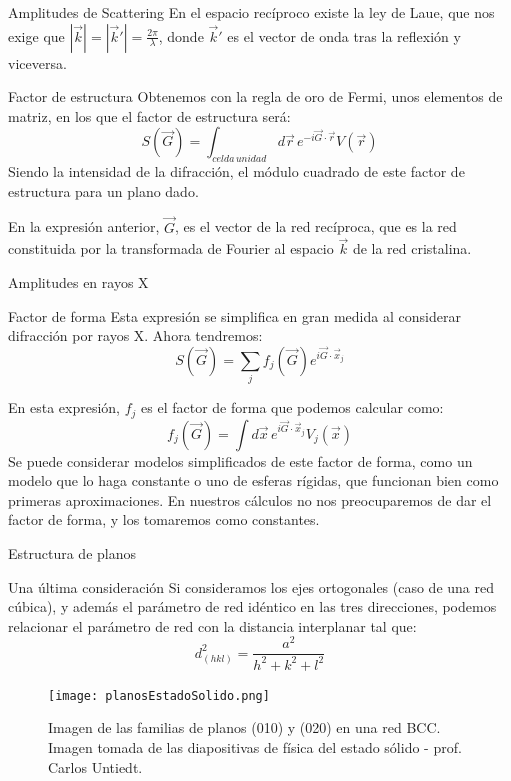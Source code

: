 \documentclass{beamer}
\begin{document}
\begin{frame}{Amplitudes de Scattering}
    En el espacio recíproco existe la ley de Laue, que nos exige que $|\vec{k}| = |\vec{k}'| = \frac{2\pi}{\lambda}$, donde $\vec{k}'$ es el vector de onda tras la reflexión y viceversa.
    \begin{block}{Factor de estructura}
        Obtenemos con la regla de oro de Fermi, unos elementos de matriz, en los que el factor de estructura será:
        \begin{equation}
            S(\vec{G}) = \int_{celda \, unidad} d\vec{r} \, e^{-i\vec{G}\cdot\vec{r}}V(\vec{r})
        \end{equation}
        Siendo la intensidad de la difracción, el módulo cuadrado de este factor de estructura para un plano dado.
    \end{block}
    En la expresión anterior, $\vec{G}$, es el vector de la red recíproca, que es la red constituida por la transformada de Fourier al espacio $\vec{k}$ de la red cristalina.
\end{frame}
\begin{frame}{Amplitudes en rayos X}
    \begin{block}{Factor de forma}
        Esta expresión se simplifica en gran medida al considerar difracción por rayos X. Ahora tendremos:
        \begin{equation}
            S(\vec{G}) = \sum_j f_j(\vec{G})e^{i\vec{G}\cdot\vec{x}_j}
         \end{equation}
    \end{block}
    En esta expresión, $f_j$ es el factor de forma que podemos calcular como:
    $$
    f_j(\vec{G}) = \int d\vec{x} \, e^{i\vec{G}\cdot\vec{x}_j}V_j(\vec{x})
    $$
    Se puede considerar modelos simplificados de este factor de forma, como un modelo que lo haga constante o uno de esferas rígidas, que funcionan bien como primeras aproximaciones. En nuestros cálculos no nos preocuparemos de dar el factor de forma, y los tomaremos como constantes.
\end{frame}
\begin{frame}{Estructura de planos}
    \begin{block}{Una última consideración}
        Si consideramos los ejes ortogonales (caso de una red cúbica), y además el parámetro de red idéntico en las tres direcciones, podemos relacionar el parámetro de red con la distancia interplanar tal que:
        \begin{equation}
            d_{(hkl)}^2 = \frac{a^2}{h^2 + k^2 + l^2}
            \label{eq:lattParam}
        \end{equation}
    \end{block}
    \begin{figure}[h!]
        \begin{center}
            \texttt{[image: planosEstadoSolido.png]}
        \end{center}
        \caption{Imagen de las familias de planos (010) y (020) en una red BCC. Imagen tomada de las diapositivas de física del estado sólido - prof. Carlos Untiedt.}
    \end{figure}
\end{frame}
\end{document}
